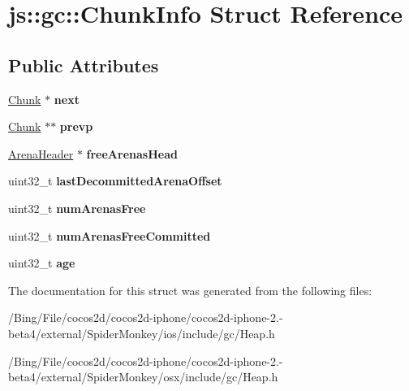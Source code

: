 \hypertarget{structjs_1_1gc_1_1_chunk_info}{\section{js\-:\-:gc\-:\-:Chunk\-Info Struct Reference}
\label{structjs_1_1gc_1_1_chunk_info}
}
\subsection*{Public Attributes}
\begin{DoxyCompactItemize}
\item 
\hypertarget{structjs_1_1gc_1_1_chunk_info_a82fddfd57e18aa9b7a04f9e31810a413}{\hyperlink{structjs_1_1gc_1_1_chunk}{Chunk} $\ast$ {\bfseries next}}\label{structjs_1_1gc_1_1_chunk_info_a82fddfd57e18aa9b7a04f9e31810a413}

\item 
\hypertarget{structjs_1_1gc_1_1_chunk_info_af6c4d60973fd95630f5034cbd8412dec}{\hyperlink{structjs_1_1gc_1_1_chunk}{Chunk} $\ast$$\ast$ {\bfseries prevp}}\label{structjs_1_1gc_1_1_chunk_info_af6c4d60973fd95630f5034cbd8412dec}

\item 
\hypertarget{structjs_1_1gc_1_1_chunk_info_afe2b164a3d8e465348a5915809b440ab}{\hyperlink{structjs_1_1gc_1_1_arena_header}{Arena\-Header} $\ast$ {\bfseries free\-Arenas\-Head}}\label{structjs_1_1gc_1_1_chunk_info_afe2b164a3d8e465348a5915809b440ab}

\item 
\hypertarget{structjs_1_1gc_1_1_chunk_info_a85e7bc134d38cede2c30f9291c14af32}{uint32\-\_\-t {\bfseries last\-Decommitted\-Arena\-Offset}}\label{structjs_1_1gc_1_1_chunk_info_a85e7bc134d38cede2c30f9291c14af32}

\item 
\hypertarget{structjs_1_1gc_1_1_chunk_info_ad7e0cf786a58da003903752dd7cb449f}{uint32\-\_\-t {\bfseries num\-Arenas\-Free}}\label{structjs_1_1gc_1_1_chunk_info_ad7e0cf786a58da003903752dd7cb449f}

\item 
\hypertarget{structjs_1_1gc_1_1_chunk_info_a84eed2b0c477756beca55b0040e280d0}{uint32\-\_\-t {\bfseries num\-Arenas\-Free\-Committed}}\label{structjs_1_1gc_1_1_chunk_info_a84eed2b0c477756beca55b0040e280d0}

\item 
\hypertarget{structjs_1_1gc_1_1_chunk_info_a13c774a4910462c2be4a0a883e30a681}{uint32\-\_\-t {\bfseries age}}\label{structjs_1_1gc_1_1_chunk_info_a13c774a4910462c2be4a0a883e30a681}

\end{DoxyCompactItemize}


The documentation for this struct was generated from the following files\-:\begin{DoxyCompactItemize}
\item 
/\-Bing/\-File/cocos2d/cocos2d-\/iphone/cocos2d-\/iphone-\/2.-\/beta4/external/\-Spider\-Monkey/ios/include/gc/Heap.\-h\item 
/\-Bing/\-File/cocos2d/cocos2d-\/iphone/cocos2d-\/iphone-\/2.-\/beta4/external/\-Spider\-Monkey/osx/include/gc/Heap.\-h\end{DoxyCompactItemize}
